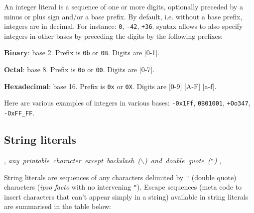 An integer literal is a sequence of one or more digits, optionally
preceded by a minus or plus sign and/or a base prefix. By default,
i.e. without a base prefix, integers are in decimal. For instance:
{\tt 0}, {\tt -42}, {\tt +36}. {\focal} syntax allows to also specify
integers in other bases by preceding the digits by the following
prefixes:
\begin{compact-itemize}
  \item {\bf Binary}: base 2. Prefix is {\tt 0b} or {\tt 0B}.
    Digits are [0-1].
  \item {\bf Octal}: base 8. Prefix is {\tt 0o} or {\tt 00}.
    Digits are [0-7].
  \item {\bf Hexadecimal}: base 16. Prefix is {\tt 0x} or {\tt 0X}.
    Digits are [0-9] [A-F] [a-f].
\end{compact-itemize}
Here are various examples of integers in various bases:
{\tt -0x1Ff}, {\tt 0B01001}, {\tt +Oo347}, {\tt -OxFF\_FF}.

\subsection{String literals}
\label{string literal}

\begin{syn}
 \is
\sep
{} \is \mbox{\em any printable character except backslash
  ($\backslash$) and double quote ({\tt"})}
\sep
{} \is
      \orelse {} \orelse {} \orelse {}
\alt \tok{\textvisiblespace} \orelse {} \orelse {} \orelse \tok{*}
     \orelse \tok{\backslash} \orelse {} \orelse \tok{-}
\alt \tok{(} \orelse \tok{)} \orelse \tok{[} \orelse \tok{]}
     \orelse \tok{\{} \orelse \tok{\}} \orelse \tok{\%}
\alt {}  
\alt {} 
\end{syn}

String literals are sequences of any characters delimited by {\tt "}
(double quote) characters ({\em ipso facto} with no intervening
{\tt"}).
Escape sequences (meta code to insert characters that can't appear
simply in a string) available in string literals are summarised in the
table below:


